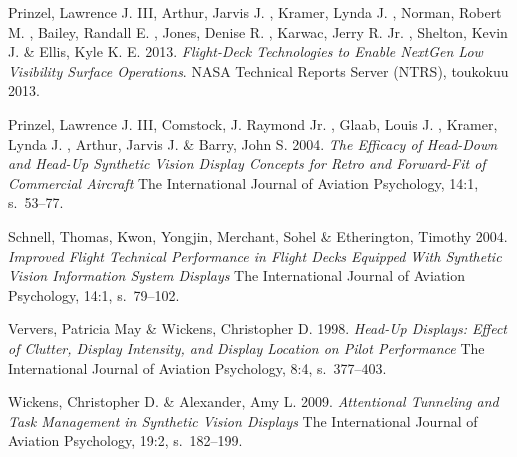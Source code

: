 \documentclass[utf8,bachelor,manualbib]{gradu3}
\begin{document}
\begin{thebibliography}{}
Prinzel, Lawrence J. III, Arthur, Jarvis J. , Kramer, Lynda J. ,  Norman, Robert M. , Bailey, Randall E. , Jones, Denise R. ,  Karwac, Jerry R. Jr. , Shelton, Kevin J. \& Ellis, Kyle K. E. 2013.
\textit{Flight-Deck Technologies to Enable NextGen Low Visibility Surface Operations}.
NASA Technical Reports Server (NTRS), toukokuu 2013.

Prinzel, Lawrence J. III, Comstock, J. Raymond Jr. , Glaab, Louis J. , Kramer, Lynda J. , Arthur, Jarvis J. \& Barry, John S. 2004.
\textit{The Efficacy of Head-Down and Head-Up Synthetic Vision Display Concepts for Retro and Forward-Fit of Commercial Aircraft}
The International Journal of Aviation Psychology, 14:1, s.~53--77.

Schnell, Thomas,  Kwon, Yongjin, Merchant, Sohel \& Etherington, Timothy 2004.
\textit{Improved Flight Technical Performance in Flight Decks Equipped With Synthetic Vision Information System Displays}
The International Journal of Aviation Psychology, 14:1, s.~79--102.

Ververs, Patricia May \& Wickens, Christopher D. 1998.
\textit{Head-Up Displays: Effect of Clutter, Display Intensity, and Display Location on Pilot Performance}
The International Journal of Aviation Psychology, 8:4, s.~377--403.

Wickens, Christopher D. \& Alexander, Amy L. 2009.
\textit{Attentional Tunneling and Task Management in Synthetic Vision Displays}
The International Journal of Aviation Psychology, 19:2, s.~182--199.










\end{thebibliography}
\end{document}
